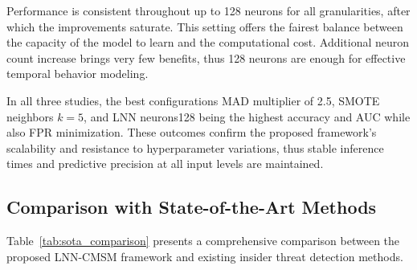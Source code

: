 Performance is consistent throughout up to 128 neurons for all granularities, after which the improvements saturate. This setting offers the fairest balance between the capacity of the model to learn and the computational cost. Additional neuron count increase brings very few benefits, thus 128 neurons are enough for effective temporal behavior modeling.

In all three studies, the best configurations MAD multiplier of 2.5, SMOTE neighbors $k=5$, and LNN neurons128 being the highest accuracy and AUC while also FPR minimization. These outcomes confirm the proposed framework's scalability and resistance to hyperparameter variations, thus stable inference times and predictive precision at all input levels are maintained.



\subsection{Comparison with State-of-the-Art Methods}
Table~\ref{tab:sota_comparison} presents a comprehensive comparison between the proposed LNN-CMSM framework and existing insider threat detection methods.


